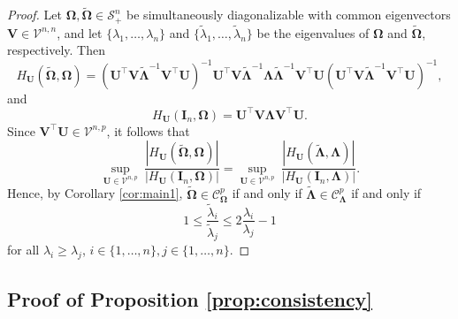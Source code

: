 \documentclass[12pt]{article}
\newcommand{\bl}[1]{{\mathbf #1}}
\newcommand{\bs}[1]{\boldsymbol #1}
\begin{document}
\begin{proof}
    Let $\bs{\Omega}, \tilde{\bs{\Omega}} \in \mathcal{S}_+^n$ be simultaneously diagonalizable with common eigenvectors $\bl{V} \in \mathcal{V}^{n,n}$, and let $\{\lambda_1, \dots, \lambda_n\}$ and $\{\tilde{\lambda}_1, \dots, \tilde{\lambda}_n\}$ be the eigenvalues of $\bs{\Omega}$ and $\tilde{\bs{\Omega}}$, respectively. Then
\begin{equation*}
    H_{\bl{U}}(\tilde{\bs{\Omega}}, \bs{\Omega}) = (\bl{U}^\top \bl{V} \tilde{\bs{\Lambda}}^{-1} \bl{V}^\top \bl{U})^{-1} \bl{U}^\top \bl{V} \tilde{\bs{\Lambda}}^{-1} \bs{\Lambda} \tilde{\bs{\Lambda}}^{-1} \bl{V}^\top \bl{U}(\bl{U}^\top \bl{V} \tilde{\bs{\Lambda}}^{-1} \bl{V}^\top \bl{U})^{-1},
\end{equation*}
and
\begin{equation*}
    H_{\bl{U}}(\bl{I}_n, \bs{\Omega}) = \bl{U}^\top \bl{V} \bs{\Lambda} \bl{V}^\top \bl{U}.
\end{equation*}
Since $\bl{V}^\top \bl{U} \in \mathcal{V}^{n, p}$, it follows that
\begin{equation*}
\underset{\bl{U} \in \mathcal{V}^{n,p}}{\sup}~\frac{|H_{\bl{U}}(\tilde{\bs{\Omega}}, \bs{\Omega})|}{|H_{\bl{U}}(\bl{I}_n, \bs{\Omega})|} = \underset{\bl{U} \in \mathcal{V}^{n,p}}{\sup}~\frac{|H_{\bl{U}}(\tilde{\bs{\Lambda}}, \bs{\Lambda})|}{|H_{\bl{U}}(\bl{I}_n, \bs{\Lambda})|}.
\end{equation*}
Hence, by Corollary \ref{cor:main1}, $\tilde{\bs{\Omega}} \in \mathcal{C}^p_{\bs{\Omega}}$ if and only if $\tilde{\bs{\Lambda}} \in \mathcal{C}^p_{\bs{\Lambda}}$ if and only if
\begin{equation}
        1 \leq \frac{\tilde{\lambda}_i}{\tilde{\lambda}_j} \leq 2\frac{\lambda_i}{\lambda_j} - 1
    \end{equation}
for all $\lambda_i \geq \lambda_j$, $i \in \{1, \dots, n\}, j \in \{1, \dots, n\}$.
\end{proof}

\subsection{{Proof of Proposition \ref{prop:consistency}}}
\end{document}
